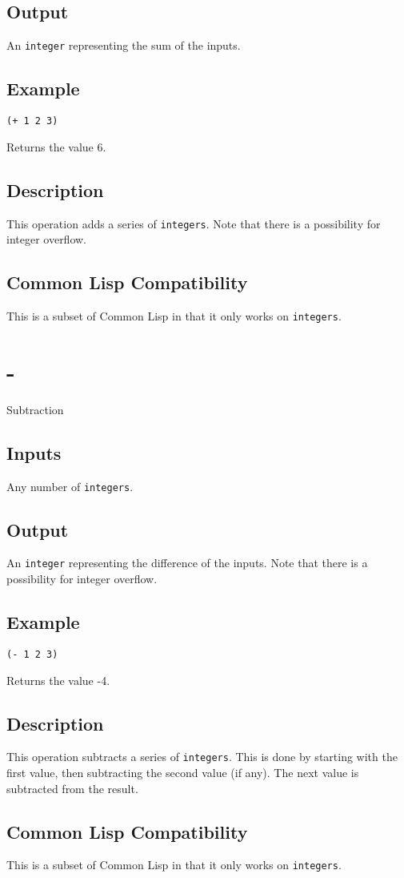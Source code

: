\documentclass[10pt, openany]{book}
\newcommand{\datatype}[1]{\texttt{#1}}
\newcommand{\cl}{Common Lisp}
\begin{document}
\subsection{Output}
An \datatype{integer} representing the sum of the inputs.
\subsection{Example}
\begin{lstlisting}
(+ 1 2 3)
\end{lstlisting}
Returns the value 6.
\subsection{Description}
This operation adds a series of \datatype{integers}.  Note that there is a possibility for integer overflow.
\subsection{Common Lisp Compatibility}
This is a subset of \cl{} in that it only works on \datatype{integers}.

\section{-}
Subtraction
\subsection{Inputs}
Any number of \datatype{integers}.
\subsection{Output}
An \datatype{integer} representing the difference of the inputs.  Note that there is a possibility for integer overflow.
\subsection{Example}
\begin{lstlisting}
(- 1 2 3)
\end{lstlisting}
Returns the value -4.
\subsection{Description}
This operation subtracts a series of \datatype{integers}.  This is done by starting with the first value, then subtracting the second value (if any).  The next value is subtracted from the result.
\subsection{Common Lisp Compatibility}
This is a subset of \cl{} in that it only works on \datatype{integers}.
\end{document}
